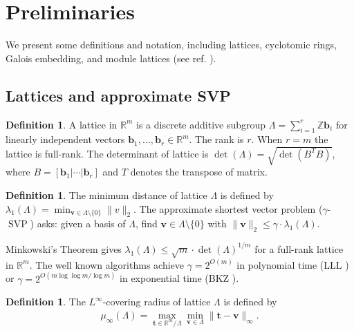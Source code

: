 \documentclass[11pt,a4paper]{article}
\theoremstyle{plain}
\theoremstyle{definition}
\newtheorem{definition}[theorem]{Definition}
\theoremstyle{remark}
\DeclareMathOperator{\SVP}{SVP}
\newcommand{\Z}{\mathbb{Z}}
\newcommand{\R}{\mathbb{R}}
\begin{document}
\section{Preliminaries}\label{sec:prelim}

We present some definitions and notation, including lattices, cyclotomic rings, Galois embedding, and module lattices (see ref. \cite{BernsteinBuchmannDahmen2017}). 

\subsection{Lattices and approximate SVP}

\begin{definition}
\label{D:lattice}
A lattice in $\R^m$ is a discrete additive subgroup $\Lambda=\sum_{i=1}^r \Z \mathbf{b}_i$ for linearly independent vectors $\mathbf{b}_1, \dots, \mathbf{b}_r\in\R^m$. The rank is $r$. When $r=m$ the lattice is full-rank. The determinant of lattice is  $\det(\Lambda)=\sqrt{\det(B^TB)}$, where $B=[\mathbf{b}_1|\cdots|\mathbf{b}_r]$ and $T$ denotes the transpose of matrix.

\end{definition}

\begin{definition}
\label{D:aSVP}
The minimum distance of lattice $\Lambda$ is defined by $\lambda_1(\Lambda)=\min_{\mathbf{v}\in\Lambda\setminus\{0\}} \|v\|_2$. The approximate shortest vector problem ($\gamma$-$\SVP$) asks: given a basis of $\Lambda$, find $\mathbf{v}\in\Lambda\setminus\{0\}$ with $\|\mathbf{v}\|_2 \le \gamma\cdot\lambda_1(\Lambda)$.

\end{definition}

Minkowski's Theorem gives $\lambda_1(\Lambda) \le \sqrt{m}\cdot\det(\Lambda)^{1/m}$ for a full-rank lattice in $\R^m$. The well known algorithms achieve $\gamma=2^{O(m)}$ in polynomial time (LLL \cite{LLL82}) or $\gamma=2^{O(m\log\log m/\log m)}$ in exponential time (BKZ \cite{Schnorr87,GN08,ADRS15,AGVW17}).

\begin{definition}
\label{D:coveringr}
The $L^\infty$-covering radius of lattice $\Lambda$ is defined by 
\begin{align}
  \mu_\infty(\Lambda)=\max_{\mathbf{t}\in\R^m/\Lambda} \min_{\mathbf{v}\in\Lambda} \|\mathbf{t}-\mathbf{v}\|_\infty.
  \label{E:coveringr}
\end{align}

\end{definition}
\end{document}
